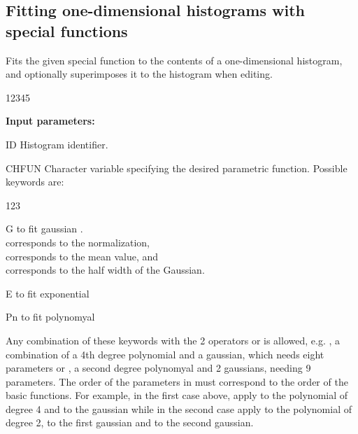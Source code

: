 
\subsection{Fitting one-dimensional histograms with special functions}


\Action
Fits the given special function to the contents of a
one-dimensional histogram, and optionally superimposes
it to the histogram when editing.
 
\begin{DLtt}{12345}
\item[{\rm\bf Input parameters:}]
\item[ID] Histogram identifier.
\item[CHFUN] Character variable specifying the desired parametric function.
      Possible keywords are:
      \begin{DLtt}{123}
      \item[G] to fit gaussian .\\
       corresponds to the normalization,\\
       corresponds to the mean value, and\\
       corresponds to the half width of the Gaussian.
      \item[E] to fit exponential 
      \item[Pn] to fit polynomyal 
      \end{DLtt}
      Any combination of these keywords with the 2 operators \Lit{+} or \Lit{*}
      is allowed, e.g. , a combination of a 4th degree polynomial
      and a gaussian, which needs eight parameters or
      , a second degree polynomyal and 2 gaussians,
      needing 9 parameters.
      The order of the parameters in  must
      correspond to the order of the basic functions.
      For example, in the first case above,  apply to
      the polynomial of degree 4 and  to the gaussian while
      in the second case  apply to the polynomial of degree 2,
       to the first gaussian and  to the second gaussian.

\end{DLtt}
